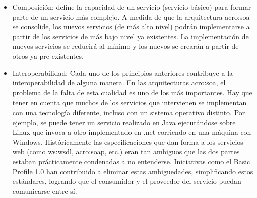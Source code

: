 \begin{itemize}
  \item Composición: define la capacidad de un servicio (servicio básico) para formar parte de un servicio más complejo. A medida de que la arquitectura \gls{acro:soa} se consolide, los nuevos servicios (de más alto nivel) podrán implementarse a partir de los servicios de más bajo nivel ya existentes. La implementación de nuevos servicios se reducirá al mínimo y los nuevos se crearán a partir de otros ya pre existentes.

  \item Interoperabilidad: Cada uno de los principios anteriores contribuye a la interoperabilidad de alguna manera. En las arquitecturas \gls{acro:soa}, el problema de la falta de esta cualidad es uno de los más importantes. Hay que tener en cuenta que muchos de los servicios que intervienen se implementan con una tecnología diferente, incluso con un sistema operativo distinto.
  Por ejemplo, se puede tener un servicio realizado en Java ejecutándose sobre Linux que invoca a otro implementado en .net corriendo en una máquina con Windows. Históricamente las especificaciones que dan forma a los servicios web (como \gls{ws:wsdl}, \gls{acro:soap}, etc.) eran tan ambiguos que las dos partes estaban prácticamente condenadas a no entenderse. Iniciativas como el Basic Profile 1.0 han contribuido a eliminar estas ambiguedades, simplificando estos estándares, logrando que el consumidor y el proveedor del servicio puedan comunicarse entre sí.

\end{itemize}


